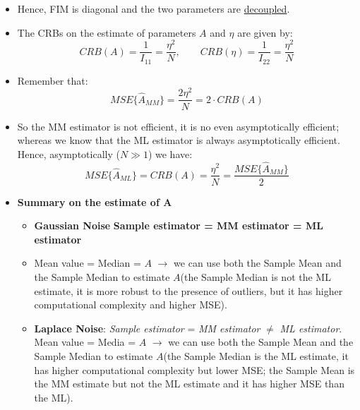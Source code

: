 \begin{itemize}
\begin{align*}
I_{12} &= -E\left\{ \frac{d^2 \ln LF(A,\eta)}{dA d\eta} \right\} \\
&= \frac{1}{\eta^2} \sum_{n=0}^{N-1} E\left\{ \mathrm{sign}(x_n - A) \right\} \\
&= \frac{1}{\eta^2} \sum_{n=0}^{N-1} \left[ 1 \cdot \Pr\{x_n > A\} + (-1) \cdot \Pr\{x_n < A\} \right] \\
&= \frac{1}{\eta^2} \sum_{n=0}^{N-1} \left[ \frac{1}{2} - \frac{1}{2} \right] = 0
\end{align*}
\item Hence, FIM is diagonal and the two parameters are \underline{decoupled}.
\item The CRBs on the estimate of parameters \(A\) and \(\eta\) are given by:
\[
CRB(A)=\frac{1}{I_{11}}=\frac{\eta^2}{N}, \qquad CRB (\eta)=\frac{1}{I_{22}}=\frac{\eta^2}{N}
\]
\item Remember that:
\[
MSE\{\hat{A}_{MM}\} = \frac{2\eta^2}{N}=2\cdot CRB(A)
\]
\item So the MM estimator is not efficient, it is no even asymptotically efficient; whereas we know that the ML estimator is always asymptotically efficient. Hence, asymptotically (\(N\gg1\)) we have:
\[
MSE\{\hat{A}_{ML}\}=CRB(A)=\frac{\eta^2}{N}=\frac{MSE\{\hat{A}_{MM}\}}{2}
\] 

\item \textbf{Summary on the estimate of A}
    \begin{itemize}
        \item \textbf{Gaussian Noise} \textbf{Sample estimator = MM estimator = ML estimator}
        \item Mean value = Median = \(A\) \(\rightarrow\) we can use both the Sample Mean and the Sample Median to estimate \(A\)(the Sample Median is not the ML estimate, it is more robust to the presence of outliers, but it has higher computational complexity and higher MSE).
        \item \textbf{Laplace Noise}: \textit{Sample estimator} = \textit{MM estimator} \(\neq\) \textit{ML estimator}.\\
        Mean value = Media = \(A\) \(\rightarrow\) we can use both the Sample Mean and the Sample Median to estimate \(A\)(the Sample Median is the ML estimate, it has higher computational complexity but lower MSE; the Sample Mean is the MM estimate but not the ML estimate and it has higher MSE than the ML).
        

\end{itemize}
\end{itemize}
